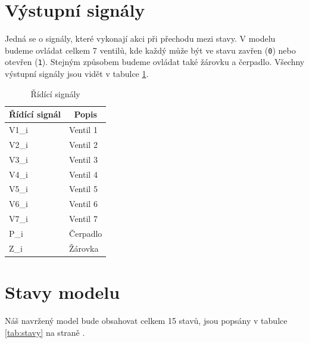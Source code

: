 \documentclass[12pt]{report}
\begin{document}
	\section{Výstupní signály}
	Jedná se o signály, které vykonají akci při přechodu mezi stavy. V modelu budeme ovládat celkem 7 ventilů, kde každý může být ve stavu zavřen (\texttt{0}) nebo otevřen (\texttt{1}). Stejným způsobem budeme ovládat také žárovku a čerpadlo. Všechny výstupní signály jsou vidět v tabulce \ref{tab:ridici}.
	
	\begin{table}[]
		\centering
		\begin{tabular}{ll}
			\hline
			\multicolumn{1}{c}{Řídící signál} 	& \multicolumn{1}{c}{Popis}  	\\ \hline
			V1\_i          					  	& Ventil 1      			   	\\
			V2\_i         					  	& Ventil 2      				\\
			V3\_i          					  	& Ventil 3      				\\
			V4\_i          					  	& Ventil 4      				\\
			V5\_i          					  	& Ventil 5      				\\
			V6\_i          					  	& Ventil 6      				\\
			V7\_i          					  	& Ventil 7      				\\
			P\_i          					  	& Čerpadlo      				\\
			Z\_i          					  	& Žárovka      					\\ \hline
		\end{tabular}
		\caption{Řídící signály}
		\label{tab:ridici}
	\end{table}	

	\section{Stavy modelu}
	Náš navržený model bude obsahovat celkem 15 stavů, jsou popsány v tabulce \ref{tab:stavy} na straně \pageref{tab:stavy}.
			
\end{document}
